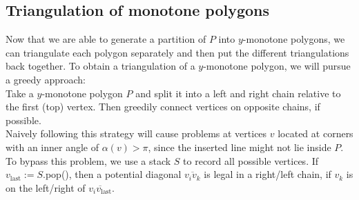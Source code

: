     \subsection{Triangulation of monotone polygons}
        Now that we are able to generate a partition of $P$ into $y$-monotone polygons, we can triangulate each polygon separately and then put the different triangulations back together. To obtain a triangulation of a $y$-monotone polygon, we will pursue a greedy approach: \\ 
        Take a $y$-monotone polygon $P$ and split it into a left and right chain relative to the first (top) vertex. Then greedily connect vertices on opposite chains, if possible. \\
        Naively following this strategy will cause problems at vertices $v$ located at corners with an inner angle of $\alpha(v) > \pi$, since the inserted line might not lie inside $P$. To bypass this problem, we use a stack $S$ to record all possible vertices. If $v_\text{last} := S.$pop(), then a potential diagonal $\overline{v_i v_k}$ is legal in a right/left chain, if $v_k$ is on the left/right of $\overline{v_i v_\text{last}}$. 

